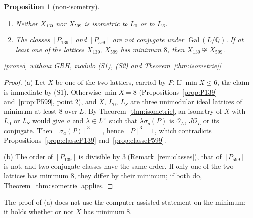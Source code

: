 \documentclass[11pt,a4paper]{amsart}
\theoremstyle{plain}
\newtheorem{proposition}[theorem]{Proposition}
\theoremstyle{definition}
\numberwithin{equation}{section}
\newcommand{\Q}{\mathbb{Q}}
\newcommand{\OO}{\mathcal{O}}
\DeclareMathOperator{\Gal}{Gal}
\newcommand{\Lz}{L_{0}}
\newcommand{\LS}{L_{S}}
\newcommand{\st}[1]{\textup{\textsf{\small[#1]}}}
\begin{document}
\begin{proposition}[non-isometry]\label{prop:noniso}
\begin{enumerate}[label=\textup{(\alph*)}]
\item Neither $X_{139}$ nor $X_{599}$ is isometric to $\Lz$ or to $\LS$.
\item The classes $[P_{139}]$ and $[P_{599}]$ are not conjugate under $\Gal(L/\Q)$. If at least one of the lattices $X_{139}$, $X_{599}$ has minimum $8$, then $X_{139}\not\cong X_{599}$.
\end{enumerate}
\st{proved, without GRH, modulo (S1), (S2) and Theorem~\ref{thm:isometrie}}
\end{proposition}

\begin{proof}
(a) Let $X$ be one of the two lattices, carried by $P$. If $\min X\le6$, the claim is immediate by (S1). Otherwise $\min X=8$ (Propositions~\ref{prop:P139} and~\ref{prop:P599}, point 2), and $X$, $\Lz$, $\LS$ are three unimodular ideal lattices of minimum at least $8$ over $L$. By Theorem~\ref{thm:isometrie}, an isometry of $X$ with $\Lz$ or $\LS$ would give $a$ and $\lambda\in L^\times$ such that $\lambda\sigma_a(P)$ is $\OO_L$, $J\OO_L$ or its conjugate. Then $[\sigma_a(P)]^3=1$, hence $[P]^3=1$, which contradicts Propositions~\ref{prop:classeP139} and~\ref{prop:classeP599}.

(b) The order of $[P_{139}]$ is divisible by $3$ (Remark~\ref{rem:classes}), that of $[P_{599}]$ is not, and two conjugate classes have the same order. If only one of the two lattices has minimum $8$, they differ by their minimum; if both do, Theorem~\ref{thm:isometrie} applies.
\end{proof}

The proof of (a) does not use the computer-assisted statement on the minimum: it holds whether or not $X$ has minimum $8$.
\end{document}
